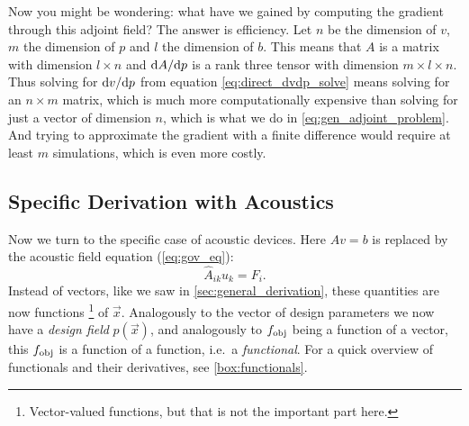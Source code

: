 Now you might be wondering: what have we gained by computing the gradient
through this adjoint field?
The answer is efficiency.
Let $n$ be the dimension of $v$, $m$ the dimension of $p$ and $l$ the dimension
of $b$.
This means that $A$ is a matrix with dimension $l\times n$ and $\difs{A}{p}$ is
a rank three tensor with dimension $m\times l\times n$.
Thus solving for $\difs{v}{p}$ from equation \cref{eq:direct_dvdp_solve}
means solving for an $n \times m$ matrix, which is much more computationally
expensive than solving for just a vector of dimension $n$, which is what we do
in \cref{eq:gen_adjoint_problem}.
And trying to approximate the gradient with a finite difference would require at
least $m$ simulations, which is even more costly.

\subsection{Specific Derivation with Acoustics}\label{sec:spec_der}

Now we turn to the specific case of acoustic devices.
Here $A v = b$ is replaced by the acoustic field equation (\cref{eq:gov_eq}):
\begin{equation}\label{eq:sim_eq}
	\hat A_{ik} u_k = F_i.
\end{equation}
Instead of vectors, like we saw in \cref{sec:general_derivation}, these quantities are now functions%
\footnote{%
	Vector-valued functions, but that is not the important part here.
}
of $\vec x$.
Analogously to the vector of design parameters we now have a \emph{design field}
$p(\vec x)$,
and analogously to $f_\text{obj}$ being a function of a vector, this $f_\text{obj}$ is a
function of a function, i.e.\ a \emph{functional}.
For a quick overview of functionals and their derivatives, see
\cref{box:functionals}.

